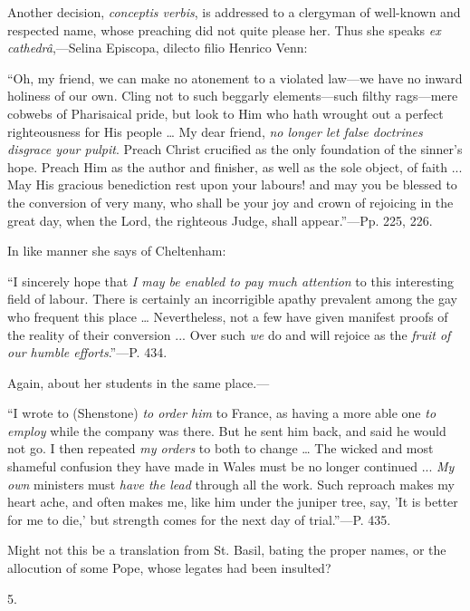 Another decision, \emph{conceptis verbis}, is
addressed to a clergyman of well-known and respected name, whose
preaching did not quite please her. Thus she speaks \emph{ex cathedrâ},—Selina
Episcopa, dilecto filio Henrico Venn:

``Oh,
my friend, we can make no atonement to a violated law—we have no
inward holiness of our own. Cling not to such beggarly elements—such
filthy rags—mere cobwebs of Pharisaical pride, but look to Him who
hath wrought out a perfect righteousness for His people … My dear
friend, \emph{no longer let false doctrines disgrace your pulpit}.
Preach Christ crucified as the only foundation of the sinner's hope.
Preach Him as the author and finisher, as well as the sole object, of
faith ... May His gracious benediction rest upon your labours! and may
you be blessed to the conversion of very many, who shall be your joy
and crown of rejoicing in the great day, when the Lord, the righteous
Judge, shall appear.''—Pp. 225, 226.

In like manner she says of Cheltenham:

``I
sincerely hope that \emph{I may be enabled to pay much attention} to
this interesting field of labour. There is certainly an incorrigible
apathy prevalent among the gay who frequent this place …
Nevertheless, not a few have given manifest proofs of the reality of
their conversion ... Over such \emph{we} do and will rejoice as the \emph{fruit
of our humble efforts}.''—P. 434.

Again, about her students in the same place.—

``I
wrote to (Shenstone) \emph{to order him} to France, as having a more
able one \emph{to employ} while the company was there. But he sent him
back, and said he would not go. I then repeated \emph{my orders} to
both to change … The wicked and most shameful confusion they have
made in Wales must be no longer continued ... \emph{My own} ministers
must \emph{have the lead} through all the work. Such reproach makes my
heart ache, and often makes me, like him under the juniper tree, say,
'It is better for me to die,' but strength comes for the next day of
trial.''—P. 435.

Might not this be a translation from St. Basil,
bating the proper names, or the allocution of some Pope, whose legates
had been insulted?

5.

